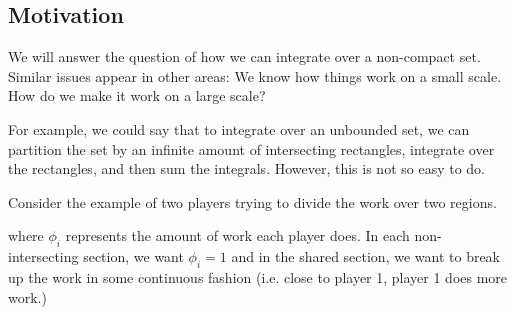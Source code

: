 \documentclass{article}
\begin{document}
\subsection{Motivation}
We will answer the question of how we can integrate over a non-compact set. Similar issues appear in other areas: We know how things work on a small scale. How do we make it work on a large scale?

For example, we could say that to integrate over an unbounded set, we can partition the set by an infinite amount of intersecting rectangles, integrate over the rectangles, and then sum the integrals. However, this is not so easy to do.

Consider the example of two players trying to divide the work over two regions.
\begin{center}
\end{center}
where $\phi_i$ represents the amount of work each player does. In each non-intersecting section, we want $\phi_i=1$ and in the shared section, we want to break up the work in some continuous fashion (i.e. close to player 1, player 1 does more work.)
\end{document}
